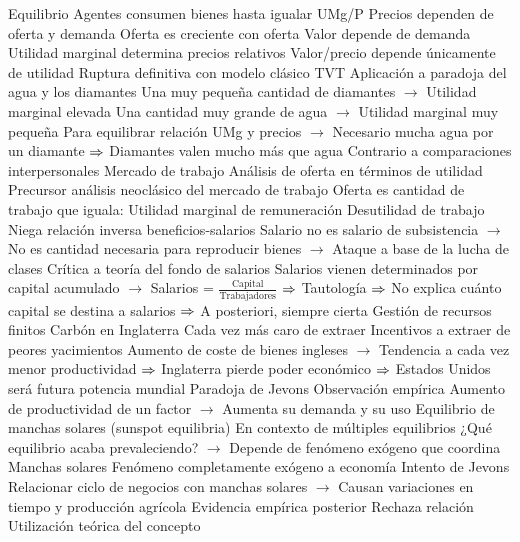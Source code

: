 \documentclass{nuevotema}
\begin{document}
\begin{esquemal}
				\4 Equilibrio
				\4[] Agentes consumen bienes hasta igualar UMg/P
				\4[] Precios dependen de oferta y demanda
				\4[] Oferta es creciente con oferta
				\4[$\then$] Valor depende de demanda
				\4[$\then$] Utilidad marginal determina precios relativos
				\4[$\then$] Valor/precio depende únicamente de utilidad
				\4[] Ruptura definitiva con modelo clásico TVT
				\4 Aplicación a paradoja del agua y los diamantes
				\4[] Una muy pequeña cantidad de diamantes
				\4[] $\to$ Utilidad marginal elevada
				\4[] Una cantidad muy grande de agua
				\4[] $\to$ Utilidad marginal muy pequeña
				\4[] Para equilibrar relación UMg y precios
				\4[] $\to$ Necesario mucha agua por un diamante
				\4[] $\then$ Diamantes valen mucho más que agua
				\4 Contrario a comparaciones interpersonales
			\3 Mercado de trabajo
				\4 Análisis de oferta en términos de utilidad
				\4[] Precursor análisis neoclásico del mercado de trabajo
				\4 Oferta es cantidad de trabajo que iguala:
				\4[] Utilidad marginal de remuneración
				\4[] Desutilidad de trabajo
				\4 Niega relación inversa beneficios-salarios
				\4[] Salario no es salario de subsistencia
				\4[] $\to$ No es cantidad necesaria para reproducir bienes
				\4[] $\to$ Ataque a base de la lucha de clases
				\4 Crítica a teoría del fondo de salarios
				\4[] Salarios vienen determinados por capital acumulado
				\4[] $\to$ Salarios = $\frac{\text{Capital}}{\text{Trabajadores}}$
				\4[] $\then$ Tautología
				\4[] $\then$ No explica cuánto capital se destina a salarios
				\4[] $\then$ A posteriori, siempre cierta
			\3 Gestión de recursos finitos
				\4 Carbón en Inglaterra
				\4[] Cada vez más caro de extraer
				\4[] Incentivos a extraer de peores yacimientos
				\4[] Aumento de coste de bienes ingleses
				\4[] $\to$ Tendencia a cada vez menor productividad
				\4[] $\then$ Inglaterra pierde poder económico
				\4[] $\then$ Estados Unidos será futura potencia mundial
				\4 Paradoja de Jevons
				\4[] Observación empírica
				\4[] Aumento de productividad de un factor
				\4[] $\to$ Aumenta su demanda y su uso
			\3 Equilibrio de manchas solares (sunspot equilibria)
				\4 En contexto de múltiples equilibrios
				\4 ¿Qué equilibrio acaba prevaleciendo?
				\4[] $\to$ Depende de fenómeno exógeno que coordina
				\4 Manchas solares
				\4[] Fenómeno completamente exógeno a economía
				\4 Intento de Jevons
				\4[] Relacionar ciclo de negocios con manchas solares
				\4[] $\to$ Causan variaciones en tiempo y producción agrícola
				\4 Evidencia empírica posterior
				\4[] Rechaza relación
				\4 Utilización teórica del concepto

\end{esquemal}
\end{document}
